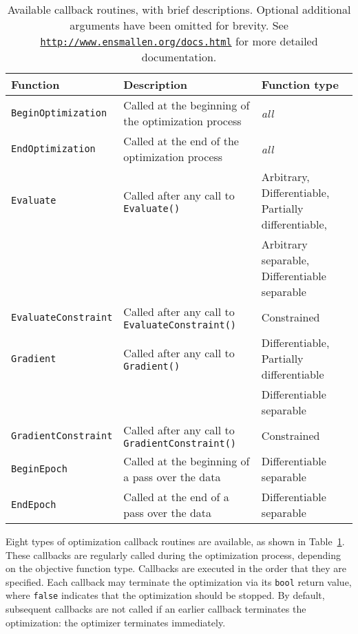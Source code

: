 \begin{table}[!b]
\centering
\small
\begin{tabular}{lll}
\toprule
{\bf Function} & {\bf Description} & {\bf Function type} \\
\hline
\texttt{BeginOptimization}   & Called at the beginning of the optimization process  & {\it all} \\
\texttt{EndOptimization}     & Called at the end of the optimization process & {\it all} \\
\texttt{Evaluate}            & Called after any call to {\tt Evaluate()}            & Arbitrary, Differentiable, Partially differentiable,  \\
                             &                                                      & Arbitrary separable, Differentiable separable \\
\texttt{EvaluateConstraint}  & Called after any call to {\tt EvaluateConstraint()}  & Constrained \\
\texttt{Gradient}            & Called after any call to {\tt Gradient()}            & Differentiable, Partially differentiable \\
                             &                                                      & Differentiable separable \\
\texttt{GradientConstraint}  & Called after any call to {\tt GradientConstraint()}  & Constrained \\
\texttt{BeginEpoch}          & Called at the beginning of a pass over the data      & Differentiable separable \\
\texttt{EndEpoch}            & Called at the end of a pass over the data            & Differentiable separable \\

\bottomrule
\end{tabular}
\vspace{0.5ex}
\caption
  {
  Available callback routines, with brief descriptions.
  Optional additional arguments have been omitted for brevity.
  See {\href{http://www.ensmallen.org/docs.html}{\mbox{\tt http://www.ensmallen.org/docs.html}}} for more detailed documentation.
  }
\label{tab:callback_list}
\end{table}

Eight types of optimization callback routines are available,
as shown in Table~\ref{tab:callback_list}.
These callbacks are regularly called during the optimization process,
depending on the objective function type.
Callbacks are executed in the order that they are specified.
Each callback may terminate the optimization via its {\tt bool} return value,
where {\tt false} indicates that the optimization should be stopped.
By default, subsequent callbacks are not called if an earlier callback terminates
the optimization: the optimizer terminates immediately.


